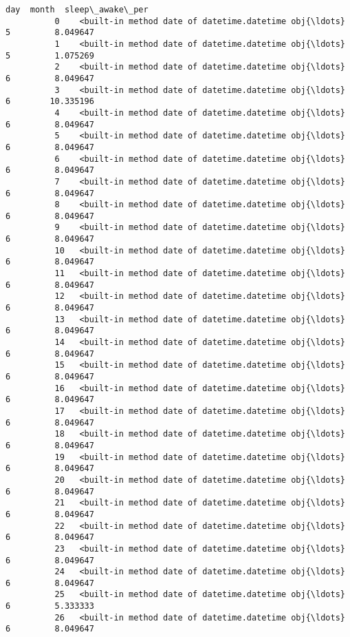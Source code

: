 \documentclass[11pt]{article}
\begin{document}
\begin{Verbatim}[commandchars=\\\{\}]
                                                             day  month  sleep\_awake\_per  
          0    <built-in method date of datetime.datetime obj{\ldots}      5         8.049647  
          1    <built-in method date of datetime.datetime obj{\ldots}      5         1.075269  
          2    <built-in method date of datetime.datetime obj{\ldots}      6         8.049647  
          3    <built-in method date of datetime.datetime obj{\ldots}      6        10.335196  
          4    <built-in method date of datetime.datetime obj{\ldots}      6         8.049647  
          5    <built-in method date of datetime.datetime obj{\ldots}      6         8.049647  
          6    <built-in method date of datetime.datetime obj{\ldots}      6         8.049647  
          7    <built-in method date of datetime.datetime obj{\ldots}      6         8.049647  
          8    <built-in method date of datetime.datetime obj{\ldots}      6         8.049647  
          9    <built-in method date of datetime.datetime obj{\ldots}      6         8.049647  
          10   <built-in method date of datetime.datetime obj{\ldots}      6         8.049647  
          11   <built-in method date of datetime.datetime obj{\ldots}      6         8.049647  
          12   <built-in method date of datetime.datetime obj{\ldots}      6         8.049647  
          13   <built-in method date of datetime.datetime obj{\ldots}      6         8.049647  
          14   <built-in method date of datetime.datetime obj{\ldots}      6         8.049647  
          15   <built-in method date of datetime.datetime obj{\ldots}      6         8.049647  
          16   <built-in method date of datetime.datetime obj{\ldots}      6         8.049647  
          17   <built-in method date of datetime.datetime obj{\ldots}      6         8.049647  
          18   <built-in method date of datetime.datetime obj{\ldots}      6         8.049647  
          19   <built-in method date of datetime.datetime obj{\ldots}      6         8.049647  
          20   <built-in method date of datetime.datetime obj{\ldots}      6         8.049647  
          21   <built-in method date of datetime.datetime obj{\ldots}      6         8.049647  
          22   <built-in method date of datetime.datetime obj{\ldots}      6         8.049647  
          23   <built-in method date of datetime.datetime obj{\ldots}      6         8.049647  
          24   <built-in method date of datetime.datetime obj{\ldots}      6         8.049647  
          25   <built-in method date of datetime.datetime obj{\ldots}      6         5.333333  
          26   <built-in method date of datetime.datetime obj{\ldots}      6         8.049647  

\end{Verbatim}
\end{document}
